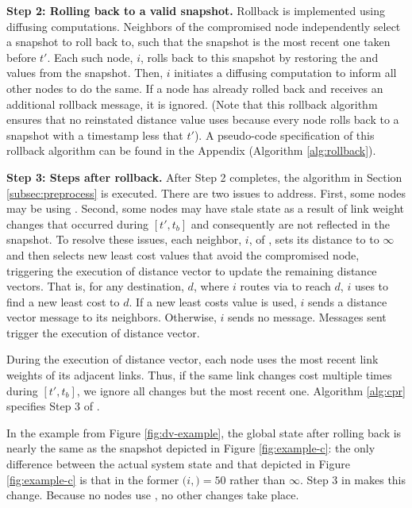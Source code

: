 {\bf Step 2: Rolling back to a valid snapshot.} 
Rollback is implemented using diffusing computations. Neighbors of the compromised node independently select a snapshot to roll back to, such that the snapshot is the most recent one taken
before $t'$.  Each such node, $i$, rolls back to this snapshot by restoring the \minvi and \dmatrixi values from the snapshot.  Then, $i$ initiates a diffusing computation to inform all other
nodes to do the same. If a node has already rolled back and receives an additional rollback message, it is ignored. 
(Note that this rollback algorithm ensures that no reinstated distance value uses \badvector because every node rolls back to a snapshot 
with a timestamp less that $t'$).  A pseudo-code specification of this rollback algorithm can be found in the Appendix (Algorithm \ref{alg:rollback}).  


{\bf Step 3: Steps after rollback.} After Step 2 completes, the algorithm in Section \ref{subsec:preprocess} is executed.
There are two issues to address.
First, some nodes may be using \oldvectors.  Second, some nodes may have stale state as a result of link weight changes that occurred during $[t',t_b]$ and 
consequently are not reflected in the snapshot. 
To resolve these issues, each neighbor, $i$, of \bads, sets its distance to \bad to $\infty$ and then selects new least cost values that avoid the compromised node, triggering
the execution of distance vector to update the remaining distance vectors.  That is, for any destination, $d$, where $i$ routes via \bad to reach $d$,
$i$ uses \dmatrixi to find a new least cost to $d$. If a new least costs value is used, $i$ sends a distance vector message to its neighbors. Otherwise, $i$ sends no message.
Messages sent trigger the execution of distance vector.

During the execution of distance vector, each node uses the most recent link weights of its adjacent links. Thus, 
if the same link changes cost multiple times during  $[t',t_b]$, we ignore all changes but the most recent one. Algorithm \ref{alg:cpr} specifies Step 3 of \cprs.

In the example from Figure \ref{fig:dv-example}, the global state after rolling back is nearly the same as the snapshot depicted in Figure \ref{fig:example-c}:
the only difference between the actual system state and that depicted in Figure \ref{fig:example-c} is that in the former 
$(i,$\bads$)=50$ rather than $\infty$. Step 3 in \cpr makes this change.  Because no nodes use \oldvectors, no other changes take place.

